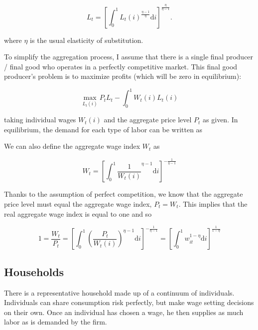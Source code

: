 \documentclass[12pt,a4paper]{scrartcl}            %
\begin{document}
\begin{equation} \label{eq:agg_labor}
    L_t = \left[ \int_0^1 L_t(i)^{\frac{\eta - 1}{\eta}} \mathrm{d}i \right]^{\frac{\eta}{\eta - 1}}.
\end{equation}

where $\eta$ is the usual elasticity of substitution.

To simplify the aggregation process, I assume that there is a single final producer / final good who operates in a perfectly competitive market.
This final good producer's problem is to maximize profits (which will be zero in equilibrium):

\begin{equation} \label{eq:firms_problem}
    \max_{L_t(i)} P_t L_t - \int_0^1 W_t(i)L_t(i)
\end{equation}

taking individual wages $W_t(i)$ and the aggregate price level $P_t$ as given.
In equilibrium, the demand for each type of labor can be written as

We can also define the aggregate wage index $W_t$ as

\begin{equation} \label{eq:wage_index}
    W_t = \left[\int_{0}^{1}\frac{1}{W_t(i)}^{\eta - 1} \mathrm{d}i \right]^{-\frac{1}{\eta - 1}}
\end{equation}

Thanks to the assumption of perfect competition, we know that the aggregate price level must equal the aggregate wage index, $P_t = W_t$.  This implies that the real aggregate wage index is equal to one and so

\begin{equation} \label{eq:real_wage}
    1 = \frac{W_t}{P_t} = \left[\int_{0}^{1} \left( \frac{P_t}{W_t(i)} \right)^{\eta - 1} \mathrm{d}i \right]^{-\frac{1}{\eta - 1} } = \left[\int_{0}^{1}w_{it}^{1 - \eta} \mathrm{d}i \right]^{ \frac{1}{1 - \eta} }
\end{equation}

\subsection{Households}
\label{sub:households}

There is a representative household made up of a continuum of individuals.
Individuals can share consumption risk perfectly, but make wage setting decisions on their own.
Once an individual has chosen a wage, he then supplies as much labor as is demanded by the firm.
\end{document}
